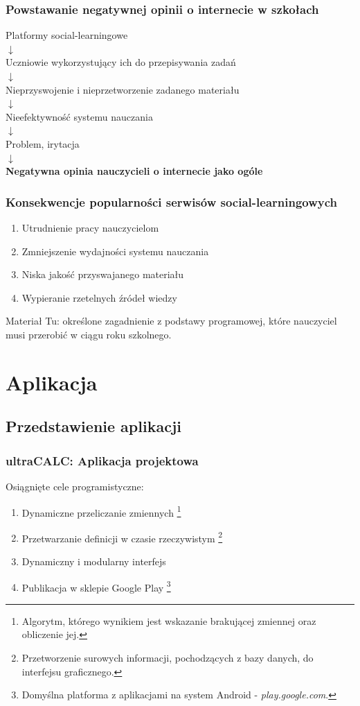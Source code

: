 \documentclass[10pt]{beamer}
\begin{document}
\begin{frame}
  \frametitle{Powstawanie negatywnej opinii o internecie w szkołach}
  \large
  \centering
  Platformy social-learningowe \\
  $\downarrow$ \\
  Uczniowie wykorzystujący ich do przepisywania zadań \\
  $\downarrow$ \\
  Nieprzyswojenie i nieprzetworzenie zadanego materiału \\
  $\downarrow$ \\
  Nieefektywność systemu nauczania \\
  $\downarrow$ \\
  Problem, irytacja \\
  $\downarrow$ \\
  \textbf{Negatywna opinia nauczycieli o internecie jako ogóle}

\end{frame}

\begin{frame}
  \frametitle{Konsekwencje popularności serwisów social-learningowych}
  \begin{enumerate}
    \item Utrudnienie pracy nauczycielom
    \item Zmniejszenie wydajności systemu nauczania
    \item Niska jakość przyswajanego materiału
    \item Wypieranie rzetelnych źródeł wiedzy
  \end{enumerate}
  \begin{block}{Materiał}
    Tu: określone zagadnienie z podstawy programowej, które nauczyciel musi przerobić w ciągu roku szkolnego.
  \end{block}
\end{frame}

\section{Aplikacja}
\subsection{Przedstawienie aplikacji}

\begin{frame}
  \frametitle{ultraCALC: Aplikacja projektowa}
  Osiągnięte cele programistyczne:
  \begin{enumerate}
    \item Dynamiczne przeliczanie zmiennych \footnote[frame]{Algorytm, którego wynikiem jest wskazanie brakującej zmiennej oraz obliczenie jej.}
    \item Przetwarzanie definicji w czasie rzeczywistym \footnote[frame]{Przetworzenie surowych informacji, pochodzących z bazy danych, do interfejsu graficznego.}
    \item Dynamiczny i modularny interfejs
    \item Publikacja w sklepie Google Play \footnote[frame]{Domyślna platforma z aplikacjami na system Android -  \emph{play.google.com}.}
  \end{enumerate}
\end{frame}
\end{document}

